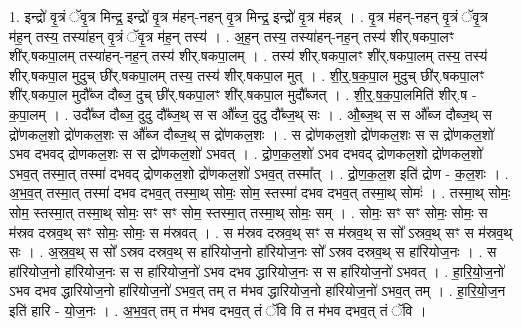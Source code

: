 \documentclass[17pt]{extarticle}
\begin{document}
1. इन्द्रो॑ वृ॒त्रं ॅवृ॒त्र मिन्द्र॒ इन्द्रो॑ वृ॒त्र म॑हन्-नहन् वृ॒त्र मिन्द्र॒ इन्द्रो॑ वृ॒त्र म॑हन्न् । . वृ॒त्र म॑हन्-नहन् वृ॒त्रं ॅवृ॒त्र म॑ह॒न् तस्य॒ तस्या॑हन् वृ॒त्रं ॅवृ॒त्र म॑ह॒न् तस्य॑ । . अ॒ह॒न् तस्य॒ तस्या॑हन्-नह॒न् तस्य॑ शीर्.षकपा॒लꣳ शी॑र्.षकपा॒लम् तस्या॑हन्-नह॒न् तस्य॑ शीर्.षकपा॒लम् । . तस्य॑ शीर्.षकपा॒लꣳ शी॑र्.षकपा॒लम् तस्य॒ तस्य॑ शीर्.षकपा॒ल मुदुच् छी॑र्.षकपा॒लम् तस्य॒ तस्य॑ शीर्.षकपा॒ल मुत् । . शी॒र्॒.ष॒क॒पा॒ल मुदुच् छी॑र्.षकपा॒लꣳ शी॑र्.षकपा॒ल मुदौ᳚ब्ज दौब्ज॒ 
दुच् छी॑र्.षकपा॒लꣳ शी॑र्.षकपा॒ल मुदौ᳚ब्जत् । . शी॒र्॒.ष॒क॒पा॒लमिति॑ शीर्.ष - क॒पा॒लम् । . उदौ᳚ब्ज दौब्ज॒ दुदु दौ᳚ब्ज॒थ् स स औ᳚ब्ज॒ दुदु दौ᳚ब्ज॒थ् सः । . औ॒ब्ज॒थ् स स औ᳚ब्ज दौब्ज॒थ् स द्रो॑णकल॒शो द्रो॑णकल॒शः स औ᳚ब्ज दौब्ज॒थ् स द्रो॑णकल॒शः । . स द्रो॑णकल॒शो द्रो॑णकल॒शः स स द्रो॑णकल॒शो॑ ऽभव दभवद् द्रोणकल॒शः स स द्रो॑णकल॒शो॑ ऽभवत् । . द्रो॒ण॒क॒ल॒शो॑ ऽभव दभवद् द्रोणकल॒शो द्रो॑णकल॒शो॑ ऽभव॒त् तस्मा॒त् तस्मा॑ दभवद् द्रोणकल॒शो द्रो॑णकल॒शो॑ ऽभव॒त् तस्मा᳚त् । . द्रो॒ण॒क॒ल॒श इति॑ द्रोण - क॒ल॒शः । . अ॒भ॒व॒त् तस्मा॒त् तस्मा॑ दभव दभव॒त् तस्मा॒थ् सोमः॒ सोम॒ स्तस्मा॑ दभव दभव॒त् तस्मा॒थ् सोमः॑ । . तस्मा॒थ् सोमः॒ सोम॒ स्तस्मा॒त् तस्मा॒थ् सोमः॒ सꣳ सꣳ सोम॒ स्तस्मा॒त् तस्मा॒थ् सोमः॒ सम् । . सोमः॒ सꣳ सꣳ सोमः॒ सोमः॒ स म॑स्रव दस्रव॒थ् सꣳ सोमः॒ सोमः॒ स म॑स्रवत् । . स म॑स्रव दस्रव॒थ् सꣳ स म॑स्रव॒थ् स सो᳚ ऽस्रव॒थ् सꣳ स म॑स्रव॒थ् सः । . अ॒स्र॒व॒थ् स सो᳚ ऽस्रव दस्रव॒थ् स हा॑रियोज॒नो हा॑रियोज॒नः सो᳚ ऽस्रव दस्रव॒थ् स हा॑रियोज॒नः । . स हा॑रियोज॒नो हा॑रियोज॒नः स स हा॑रियोज॒नो॑ ऽभव दभव द्धारियोज॒नः स स हा॑रियोज॒नो॑ ऽभवत् । . हा॒रि॒यो॒ज॒नो॑ ऽभव दभव द्धारियोज॒नो हा॑रियोज॒नो॑ ऽभव॒त् तम् त म॑भव द्धारियोज॒नो हा॑रियोज॒नो॑ ऽभव॒त् तम् । . हा॒रि॒यो॒ज॒न इति॑ हारि - यो॒ज॒नः । . अ॒भ॒व॒त् तम् त म॑भव दभव॒त् तं ॅवि वि त म॑भव दभव॒त् तं ॅवि । \newline
\end{document}
